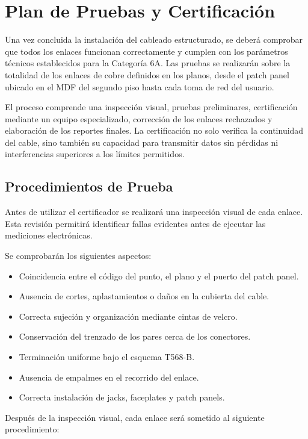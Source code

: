 
\chapter{Plan de Pruebas y Certificación}
\label{chap:plan_pruebas}

Una vez concluida la instalación del cableado estructurado, se deberá comprobar que todos los enlaces funcionan correctamente y cumplen con los parámetros técnicos establecidos para la Categoría 6A. Las pruebas se realizarán sobre la totalidad de los enlaces de cobre definidos en los planos, desde el patch panel ubicado en el MDF del segundo piso hasta cada toma de red del usuario.

El proceso comprende una inspección visual, pruebas preliminares, certificación mediante un equipo especializado, corrección de los enlaces rechazados y elaboración de los reportes finales. La certificación no solo verifica la continuidad del cable, sino también su capacidad para transmitir datos sin pérdidas ni interferencias superiores a los límites permitidos.

\section{Procedimientos de Prueba}

Antes de utilizar el certificador se realizará una inspección visual de cada enlace. Esta revisión permitirá identificar fallas evidentes antes de ejecutar las mediciones electrónicas.

Se comprobarán los siguientes aspectos:

\begin{itemize}
    \item Coincidencia entre el código del punto, el plano y el puerto del patch panel.
    \item Ausencia de cortes, aplastamientos o daños en la cubierta del cable.
    \item Correcta sujeción y organización mediante cintas de velcro.
    \item Conservación del trenzado de los pares cerca de los conectores.
    \item Terminación uniforme bajo el esquema T568-B.
    \item Ausencia de empalmes en el recorrido del enlace.
    \item Correcta instalación de jacks, faceplates y patch panels.
\end{itemize}

Después de la inspección visual, cada enlace será sometido al siguiente procedimiento:

